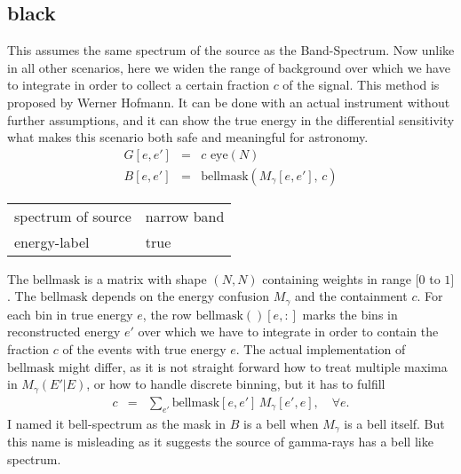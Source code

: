 \documentclass{article}%
\begin{document}
    \subsection{black}
    This assumes the same spectrum of the source as the Band-Spectrum.
    Now unlike in all other scenarios, here we widen the range of background over which we have to integrate in order to collect a certain fraction $c$ of the signal.
    This method is proposed by Werner Hofmann.
    It can be done with an actual instrument without further assumptions, and it can show the true energy in the differential sensitivity what makes this scenario both safe and meaningful for astronomy.
    \begin{eqnarray}
        G[e, e'] &=& c \, \, \mathrm{eye}(N)
        \\
        B[e, e'] &=& \mathrm{bellmask}(M_{\gamma}[e, e'], \, c)
    \end{eqnarray}
    \begin{center}
        \begin{tabular}{ll}
            spectrum of source & narrow band\\
            energy-label & true\\
        \end{tabular}
    \end{center}
    The $\mathrm{bellmask}$ is a matrix with shape $(N,N)$ containing weights in range $[0$ to $1]$.
    The $\mathrm{bellmask}$ depends on the energy confusion $M_{\gamma}$ and the containment $c$.
    For each bin in true energy $e$, the row $\mathrm{bellmask}()[e, :]$ marks the bins in reconstructed energy $e'$ over which we have to integrate in order to contain the fraction $c$ of the events with true energy $e$.
    The actual implementation of $\mathrm{bellmask}$ might differ, as it is not straight forward how to treat multiple maxima in $M_\gamma(E'\vert E)$, or how to handle discrete binning, but it has to fulfill
    \begin{eqnarray}
        c &=& \sum_{e'} \mathrm{bellmask}[e ,e'] \, M_{\gamma}[e', e], \,\,\,\,\,\, \forall e.
    \end{eqnarray}
    I named it bell-spectrum as the mask in $B$ is a bell when $M_\gamma$ is a bell itself. But this name is misleading as it suggests the source of gamma-rays has a bell like spectrum.
\end{document}
